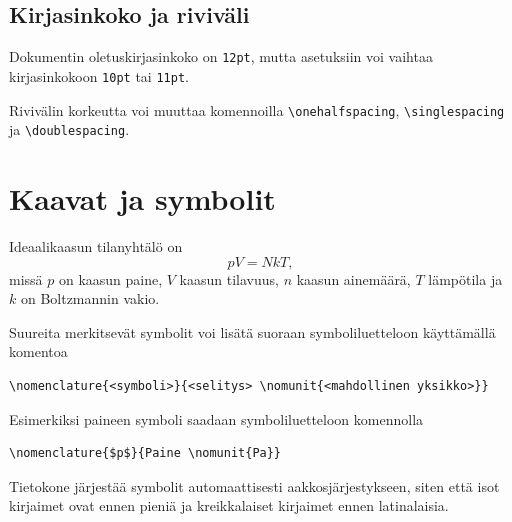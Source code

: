 \documentclass[finnish,twoside,openright]{HYgradu}
\begin{document}
\section{Kirjasinkoko ja riviv\"ali}

Dokumentin oletuskirjasinkoko on \texttt{12pt}, mutta asetuksiin voi vaihtaa kirjasinkokoon \texttt{10pt} tai \texttt{11pt}.

Riviv\"alin korkeutta voi muuttaa komennoilla \texttt{\textbackslash onehalfspacing}, \texttt{\textbackslash singlespacing}
 ja \texttt{\textbackslash doublespacing}.

\chapter{Kaavat ja symbolit}

Ideaalikaasun tilanyht\"al\"o on
\begin{equation}
\label{eq:ideal}
pV=NkT,
\end{equation}
miss\"a $p$ on kaasun paine, $V$ kaasun tilavuus, $n$ kaasun ainem\"a\"ar\"a, $T$ l\"amp\"otila ja $k$ on Boltzmannin vakio.

Suureita merkitsev\"at symbolit voi lis\"at\"a suoraan symboliluetteloon k\"aytt\"am\"all\"a komentoa
\begin{verbatim}
\nomenclature{<symboli>}{<selitys> \nomunit{<mahdollinen yksikko>}}
\end{verbatim}
Esimerkiksi paineen symboli saadaan symboliluetteloon komennolla
\begin{verbatim}
\nomenclature{$p$}{Paine \nomunit{Pa}}
\end{verbatim}
Tietokone j\"arjest\"a\"a symbolit automaattisesti aakkosj\"arjestykseen, siten ett\"a isot kirjaimet ovat ennen pieni\"a ja kreikkalaiset kirjaimet ennen latinalaisia.

\begin{center}
\end{center}
\end{document}
